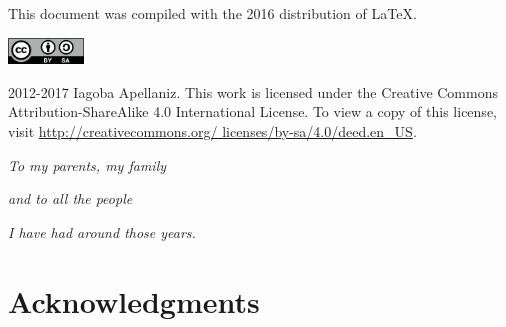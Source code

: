 \documentclass[12pt, letterpaper, twoside]{article}
\numberwithin{equation}{section}
\numberwithin{figure}{section}
\numberwithin{table}{section}
\begin{document}
\renewcommand{\thefootnote}{\fnsymbol{footnote}}

\pagestyle{fancy}
\renewcommand{\headrulewidth}{0pt}
\fancyhead{}
\fancyfoot{}





\cleardoublepage

This document was compiled with the 2016 distribution of \LaTeX.

\vfill

\includegraphics[height=20pt]{img/0-CreativeCommons-by-sa.png}

2012-2017 Iagoba Apellaniz. This work is licensed under the Creative Commons
Attribution-ShareAlike 4.0 International License. To view a copy of this
license, visit
\href{http://creativecommons.org/licenses/by-sa/4.0/deed.en_US}
{http://creativecommons.org/ licenses/by-sa/4.0/deed.en\_US}.
\clearpage






\cleardoublepage

\fancyfoot{}

\cleardoublepage
\setcounter{page}{1}

\vspace*{100pt}
\begin{center}
\emph{To my parents, my family}

\emph{and to all the people}

\emph{I have had around those years.}
\end{center}

\cleardoublepage

\fancyfoot[LE,RO]{\thepage}
\section*{Acknowledgments}
\end{document}
